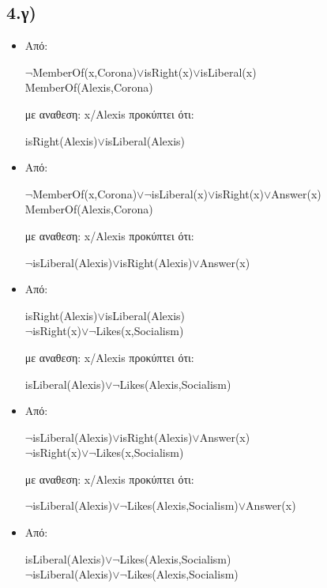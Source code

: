\documentclass[12pt,a4paper]{article}
\begin{document}
\subsection*{4.γ)}
\begin{itemize}
\item Από:\begin{center}
$\neg$\textlatin{MemberOf(x,Corona)$\vee$isRight(x)$\vee$isLiberal(x)\\
MemberOf(Alexis,Corona)}
\end{center} με αναθεση: \textlatin{x/Alexis} προκύπτει ότι: \begin{center}
\textlatin{isRight(Alexis)$\vee$isLiberal(Alexis)}\end{center}
\item Από:\begin{center}
\textlatin{
$\neg$MemberOf(x,Corona)$\vee\neg$isLiberal(x)$\vee$isRight(x)$\vee$Answer(x)\\
MemberOf(Alexis,Corona)}
\end{center} με αναθεση: \textlatin{x/Alexis} προκύπτει ότι: \begin{center}
\textlatin{$\neg$isLiberal(Alexis)$\vee$isRight(Alexis)$\vee$Answer(x)}
\end{center}
\item Από:\begin{center}
\textlatin{isRight(Alexis)$\vee$isLiberal(Alexis)}\\
\textlatin{$\neg$isRight(x)$\vee\neg$Likes(x,Socialism)}
\end{center}
 με αναθεση: \textlatin{x/Alexis} προκύπτει ότι: \begin{center}
\textlatin{isLiberal(Alexis)$\vee\neg$Likes(Alexis,Socialism)}
\end{center}
\item Από:\begin{center}
\textlatin{$\neg$isLiberal(Alexis)$\vee$isRight(Alexis)$\vee$Answer(x)}\\
\textlatin{$\neg$isRight(x)$\vee\neg$Likes(x,Socialism)}
\end{center}
 με αναθεση: \textlatin{x/Alexis} προκύπτει ότι: \begin{center}
\textlatin{$\neg$isLiberal(Alexis)$\vee\neg$Likes(Alexis,Socialism)$\vee$Answer(x)}
\end{center}
\item Από:\begin{center}
\textlatin{isLiberal(Alexis)$\vee\neg$Likes(Alexis,Socialism)\\
$\neg$isLiberal(Alexis)$\vee\neg$Likes(Alexis,Socialism)}

\end{center}
\end{itemize}
\end{document}

